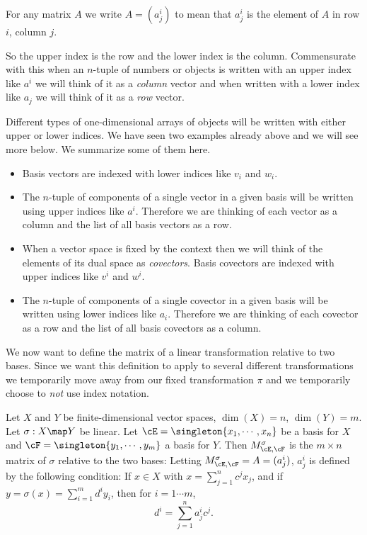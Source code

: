 \documentclass[oneside,12pt]{amsart}
\begin{document}
\begin{definition}
 For any matrix $A$ we write $A=(a^i_j)$ to mean that $a^i_j$ is the
 element of $A$ in row $i$, column $j$. 
\end{definition}

\begin{remark}
 So the upper index is the row and the lower index is the column. Commensurate with this
 when an $n$-tuple of numbers or objects is written with an upper index like $a^i$ we
 will think of it as a \emph{column} vector and when written with a lower index like $a_j$
 we will think of it as a \emph{row} vector.

Different types of one-dimensional arrays of objects will be written with either upper or
lower indices. We have seen two examples already above and we will see more below. We
summarize some of them here.
\begin{itemize}
\item Basis vectors are indexed with lower indices like $v_i$ and $w_i$. 
\item The $n$-tuple of components of a single vector in a given basis will be written using upper indices like $a^i$.
Therefore we are thinking of each vector as a column and the list of all basis vectors as a row.
\item When a vector space is fixed by the context then we will think of the elements of its dual space as \emph{covectors}.
Basis covectors are indexed with upper indices like $v^i$ and $w^i$.
\item The $n$-tuple of components of a single covector in a given basis will be written using lower indices like $a_i$.
Therefore we are thinking of each covector as a row and the list of all basis covectors as a column.
\end{itemize}
\end{remark}

We now want to define the matrix of a linear transformation relative to two bases.
Since we want this definition to apply to several different transformations we temporarily
move away from our fixed transformation $\pi$ and we temporarily choose to \emph{not} use index notation.

\begin{definition}
Let $X$ and $Y$ be finite-dimensional vector spaces, 
$\dim(X)=n$, $\dim(Y) = m$. Let $\sigma:X\map Y$ be linear.
Let $\cE = \singleton{x_1,\cdots,x_n}$ be a basis for $X$ and
$\cF=\singleton{y_1,\cdots,y_m}$ a basis for $Y$.
Then $M^{\sigma}_{\cE,\cF}$ is the $m\times n$ matrix of $\sigma$ 
relative to the two bases:
Letting $M^{\sigma}_{\cE,\cF}=A=(a^i_j)$,
$a^i_j$ is defined by the following condition:
If $x\in X$ with $x=\sum_{j=1}^n c^j x_j$, and if $y=\sigma(x) = \sum_{i=1}^m d^i y_i$, then
for $i = 1 \cdots m$, $$d^i = \sum_{j=1}^n a^i_j c^j.$$
\end{definition}
\end{document}
